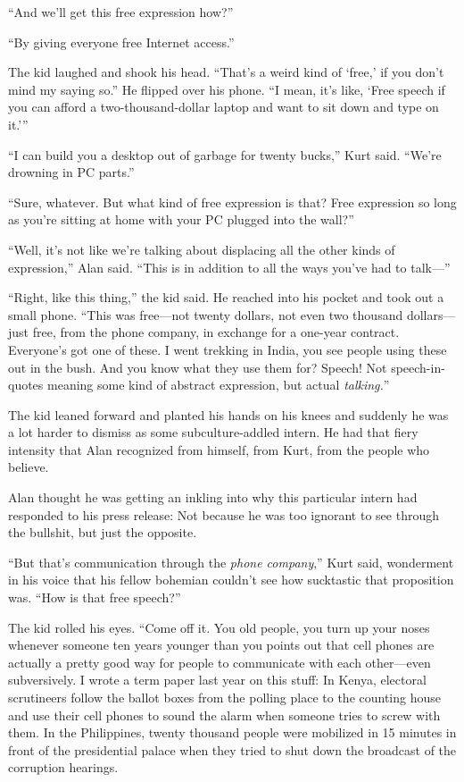 ``And we'll get this free expression how?''

``By giving everyone free Internet access.''

The kid laughed and shook his head.  ``That's a weird kind of `free,'
if you don't mind my saying so.'' He flipped over his phone.  ``I
mean, it's like, `Free speech if you can afford a two-thousand-dollar
laptop and want to sit down and type on it.'''

``I can build you a desktop out of garbage for twenty bucks,'' Kurt
said.  ``We're drowning in PC parts.''

``Sure, whatever.  But what kind of free expression is that?  Free
expression so long as you're sitting at home with your PC plugged into
the wall?''

``Well, it's not like we're talking about displacing all the other
kinds of expression,'' Alan said.  ``This is in addition to all the
ways you've had to talk---''

``Right, like this thing,'' the kid said.  He reached into his pocket
and took out a small phone.  ``This was free---not twenty dollars, not
even two thousand dollars---just free, from the phone company, in
exchange for a one-year contract.  Everyone's got one of these.  I
went trekking in India, you see people using these out in the bush. 
And you know what they use them for?  Speech!  Not speech-in-quotes
meaning some kind of abstract expression, but actual
\textit{talking.}''

The kid leaned forward and planted his hands on his knees and suddenly
he was a lot harder to dismiss as some subculture-addled intern.  He
had that fiery intensity that Alan recognized from himself, from Kurt,
from the people who believe.

Alan thought he was getting an inkling into why this particular intern
had responded to his press release:  Not because he was too ignorant
to see through the bullshit, but just the opposite.

``But that's communication through the \textit{phone company},'' Kurt
said, wonderment in his voice that his fellow bohemian couldn't see
how sucktastic that proposition was.  ``How is that free speech?''

The kid rolled his eyes.  ``Come off it.  You old people, you turn up
your noses whenever someone ten years younger than you points out that
cell phones are actually a pretty good way for people to communicate
with each other---even subversively.  I wrote a term paper last year
on this stuff:  In Kenya, electoral scrutineers follow the ballot
boxes from the polling place to the counting house and use their cell
phones to sound the alarm when someone tries to screw with them.  In
the Philippines, twenty thousand people were mobilized in 15 minutes
in front of the presidential palace when they tried to shut down the
broadcast of the corruption hearings.

